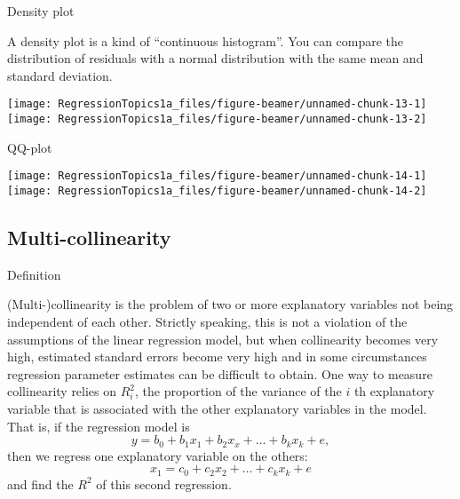 \documentclass[10pt,ignorenonframetext,]{beamer}
\begin{document}
\begin{frame}{Density plot}

A density plot is a kind of ``continuous histogram''. You can compare
the distribution of residuals with a normal distribution with the same
mean and standard deviation.

\texttt{[image: RegressionTopics1a\_files/figure-beamer/unnamed-chunk-13-1]}
\texttt{[image: RegressionTopics1a\_files/figure-beamer/unnamed-chunk-13-2]}

\end{frame}

\begin{frame}{QQ-plot}

\texttt{[image: RegressionTopics1a\_files/figure-beamer/unnamed-chunk-14-1]}
\texttt{[image: RegressionTopics1a\_files/figure-beamer/unnamed-chunk-14-2]}

\end{frame}

\subsection{Multi-collinearity}\label{multi-collinearity}

\begin{frame}{Definition}

(Multi-)collinearity is the problem of two or more explanatory variables
not being independent of each other. Strictly speaking, this is not a
violation of the assumptions of the linear regression model, but when
collinearity becomes very high, estimated standard errors become very
high and in some circumstances regression parameter estimates can be
difficult to obtain. One way to measure collinearity relies on
\(R^2_i\), the proportion of the variance of the \(i\) th explanatory
variable that is associated with the other explanatory variables in the
model. That is, if the regression model is \[
y = b_0 + b_1 x_1 + b_2 x_x + \dots + b_k x_k + e,
\] then we regress one explanatory variable on the others: \[
x_1 = c_0 + c_2 x_2 + \dots + c_k x_k + e
\] and find the \(R^2\) of this second regression.

\end{frame}
\end{document}
